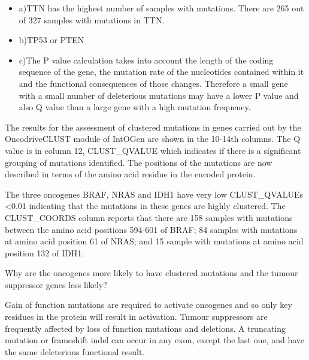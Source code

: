 \begin{answer}
\begin{itemize}
\item a)TTN has the highest number of samples with mutations. There are 265 out of 327
samples with mutations in TTN.
\item b)TP53 or PTEN
\item c)The P value calculation takes into account the length of the coding sequence
of the gene, the mutation rate of the nucleotides contained within it and the functional
consequences of those changes. Therefore a small gene with a small number of deleterious
mutations may have a lower P value and also Q value than a large gene with a high
mutation frequency.
\end{itemize}
\end{answer}

\begin{information}
The results for the assessment of clustered mutations in genes carried out by the
OncodriveCLUST module of IntOGen are shown in the 10-14th columns. The Q value is in
column 12, CLUST\_QVALUE which indicates if there is a significant grouping of mutations
identified. The positions of the mutations are now described in terms of the amino acid
residue in the encoded protein.
\end{information}

The three oncogenes BRAF, NRAS and IDH1 have very low CLUST\_QVALUEs <0.01 indicating
that the mutations in these genes are highly clustered. The CLUST\_COORDS column reports
that there are 158 samples with mutations between the amino acid positions 594-601 of
BRAF; 84 samples with mutations at amino acid position 61 of NRAS; and 15 sample with
mutations at amino acid position 132 of IDH1.

\begin{questions} 
Why are the oncogenes more likely to have clustered mutations and the tumour suppressor genes less likely?
\end{questions}

\begin{answer}
Gain of function mutations are required to activate oncogenes and so only key residues in the protein
will result in activation. Tumour suppressors are frequently affected by loss of function mutations
and deletions. A truncating mutation or frameshift indel can occur in any exon, except the last one,
and have the same deleterious functional result.
\end{answer}

